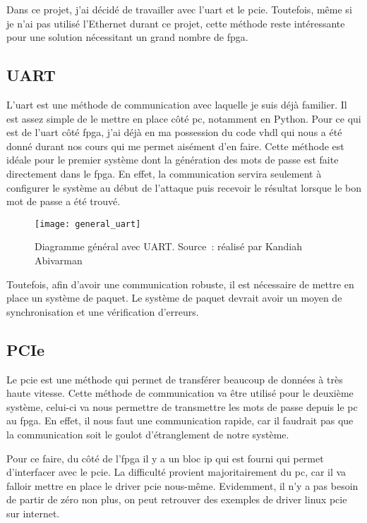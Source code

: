 Dans ce projet, j'ai décidé de travailler avec l'\gls{uart} et le \gls{pcie}. 
Toutefois, même si je n'ai pas utilisé l'Ethernet durant ce projet, cette méthode reste intéressante pour une solution nécessitant un grand nombre de \gls{fpga}.

\subsection{UART}

L'\gls{uart} est une méthode de communication avec laquelle je suis déjà familier. Il est assez simple de le mettre en place côté \gls{pc}, notamment en Python.
Pour ce qui est de l'\gls{uart} côté \gls{fpga}, j'ai déjà en ma possession du code \gls{vhdl} qui nous a été donné durant nos cours qui me permet aisément d'en faire.
Cette méthode est idéale pour le premier système dont la génération des mots de passe est faite directement dans le \gls{fpga}.
En effet, la communication servira seulement à configurer le système au début de l'attaque puis recevoir le résultat lorsque le bon mot de passe a été trouvé.

\begin{figure}[tbph!]
	\centering
	\texttt{[image: general\_uart]}
	\caption[Diagramme général avec UART]{Diagramme général avec UART. Source : réalisé par Kandiah Abivarman}
	\label{fig:general_uart}
\end{figure}

Toutefois, afin d'avoir une communication robuste, il est nécessaire de mettre en place un système de paquet.
Le système de paquet devrait avoir un moyen de synchronisation et une vérification d'erreurs.


\subsection{PCIe}

Le \gls{pcie} est une méthode qui permet de transférer beaucoup de données à très haute vitesse.
Cette méthode de communication va être utilisé pour le deuxième système, celui-ci va nous permettre de transmettre les mots de passe depuis le \gls{pc} au \gls{fpga}.
En effet, il nous faut une communication rapide, car il faudrait pas que la communication soit le goulot d'étranglement de notre système.

Pour ce faire, du côté de l'\gls{fpga} il y a un bloc \gls{ip} qui est fourni qui permet d'interfacer avec le \gls{pcie}.
La difficulté provient majoritairement du \gls{pc}, car il va falloir mettre en place le driver \gls{pcie} nous-même.
Evidemment, il n'y a pas besoin de partir de zéro non plus, on peut retrouver des exemples de driver linux \gls{pcie} sur internet.

